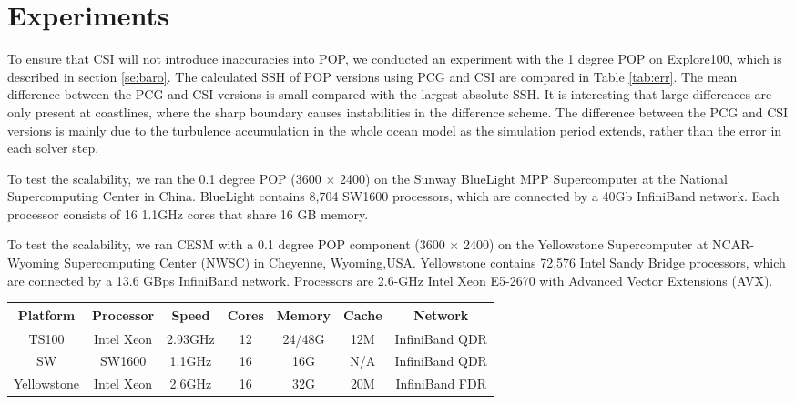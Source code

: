\documentclass{sig-alternate}
\begin{document}
\section{Experiments} \label{se:exp}
To ensure that CSI will not introduce inaccuracies into POP, we conducted an experiment with the 1 degree POP on Explore100, which is described in section \ref{se:baro}. The calculated SSH of POP versions using PCG and CSI are compared in Table \ref{tab:err}. The mean difference between the PCG and CSI versions is small compared with the largest absolute SSH. It is interesting that large differences are only present at coastlines, where the sharp boundary causes instabilities in the difference scheme. The difference between the PCG and CSI versions is mainly due to the turbulence accumulation in the whole ocean model as the simulation period extends, rather than the error in each solver step.

To test the scalability, we ran the 0.1 degree POP (3600 $\times$ 2400) on the Sunway BlueLight MPP Supercomputer at the National Supercomputing Center in China.  BlueLight contains 8,704 SW1600 processors, which are connected by a 40Gb InfiniBand network. Each processor consists of 16 1.1GHz cores that share 16 GB memory.

To test the scalability, we ran CESM with a 0.1 degree POP component (3600 $\times$ 2400) on the Yellowstone Supercomputer at NCAR-Wyoming Supercomputing Center (NWSC) in Cheyenne, Wyoming,USA. 
Yellowstone contains 72,576 Intel Sandy Bridge processors, which are connected by a 13.6 GBps InfiniBand network. Processors are 2.6-GHz Intel Xeon E5-2670 with Advanced Vector Extensions (AVX). 

\begin{center}
\begin{tabular}{|c|c|c|c|c|c|c|}
\hline
Platform & Processor &Speed    & Cores & Memory & Cache & Network \\
\hline
TS100 & Intel Xeon  & 2.93GHz & 12   &    24/48G   & 12M & InfiniBand QDR \\
\hline
SW  	  & SW1600    & 1.1GHz   & 16   & 16G       & N/A  & InfiniBand QDR\\
\hline
Yellowstone  & Intel Xeon    & 2.6GHz   & 16   & 32G       & 20M  & InfiniBand FDR \\
\hline
\end{tabular}
\end{center}
\end{document}
